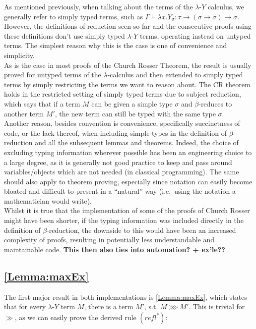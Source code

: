\documentclass[a4paper, 12pt, twoside]{style/ociamthesis}
\theoremstyle{plain}
\theoremstyle{definition}
\theoremstyle{remark}
\newcommand{\lamy}{\lambda\text{-}Y}
\begin{document}
As mentioned previously, when talking about the terms of the \(\lamy\)
calculus, we generally refer to simply typed terms, such as
\(\Gamma \vdash \lambda x. Y_\sigma : \tau \to (\sigma \to \sigma) \to \sigma\).
However, the definitions of reduction seen so far and the consecutive
proofs using these definitions don't use simply typed \(\lamy\) terms,
operating instead on untyped terms. The simplest reason why this is the
case is one of convenience and simplicity.\\
As is the case in most proofs of the Church Rosser Theorem, the result
is usually proved for untyped terms of the \(\lambda\)-calculus and then
extended to simply typed terms by simply restricting the terms we want
to reason about. The CR theorem holds in the restricted setting of
simply typed terms due to subject reduction, which says that if a term
\(M\) can be given a simple type \(\sigma\) and \(\beta\)-reduces to
another term \(M'\), the new term can still be typed with the same type
\(\sigma\). \\
Another reason, besides convention is convenience, specifically
succinctness of code, or the lack thereof, when including simple types
in the definition of \(\beta\)-reduction and all the subsequent lemmas
and theorems. Indeed, the choice of excluding typing information
wherever possible has been an engineering choice to a large degree, as
it is generally not good practice to keep and pass around
variables/objects which are not needed (in classical programming). The
same should also apply to theorem proving, especially since notation can
easily become bloated and difficult to present in a ``natural'' way
(i.e.~using the notation a mathematician would write).\\
Whilst it is true that the implementation of some of the proofs of
Church Rosser might have been shorter, if the typing information was
included directly in the definition of \(\beta\)-reduction, the downside
to this would have been an increased complexity of proofs, resulting in
potentially less understandable and maintainable code. \textbf{This then
also ties into automation? + ex'le??}

\subsection{\texorpdfstring{\cref{Lemma:maxEx}}{}}\label{section}

The first major result in both implementations is \cref{Lemma:maxEx},
which states that for every \(\lamy\) term \(M\), there is a term
\(M'\), s.t. \(M \ggg M'\). This is trivial for \(\gg\), as we can
easily prove the derived rule \((refl^*)\):
\end{document}
